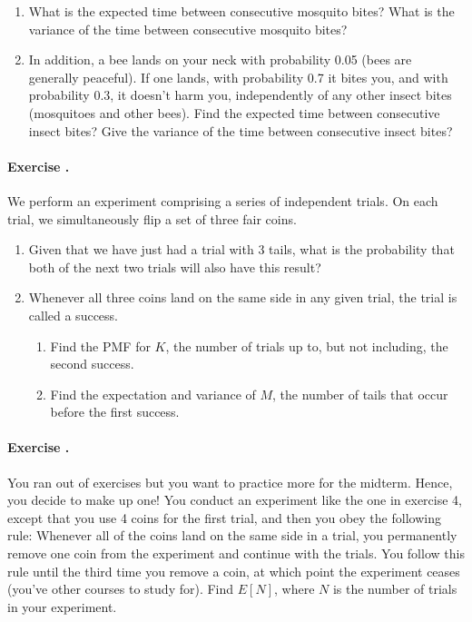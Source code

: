 \documentclass[twocolumn,12pt,a4paper]{article}
\newcounter{num}  %
\begin{document}
\begin{enumerate}
	\item What is the expected time between consecutive mosquito bites? What is the variance of the time between consecutive mosquito bites?
	
	\item In addition, a bee lands on your neck with probability 0.05 (bees are generally peaceful). If one lands, with probability 0.7 it bites you, and with probability 0.3, it doesn't harm you, independently of any other insect bites (mosquitoes and other bees). 
	Find the expected time between consecutive insect bites? 
	Give the variance of the time between consecutive insect bites?
\end{enumerate}


\paragraph{Exercise \thenum.}\label{ex:4}
We perform an experiment comprising a series of independent trials. On each trial, we simultaneously flip a set of three fair coins.

\begin{enumerate}
	\item Given that we have just had a trial with 3 tails, what is the probability that both of the next two trials will also have this result?
	
	\item Whenever all three coins land on the same side in any given trial, the trial is called a success.
	\begin{enumerate}
		\item Find the PMF for \( K \), the number of trials up to, but not including, the second success.
		
		\item Find the expectation and variance of \( M \), the number of tails that occur before the first success.
	\end{enumerate}
\end{enumerate}


\paragraph{Exercise \thenum.}
You ran out of exercises but you want to practice more for the midterm. Hence, you decide to make up one!
You conduct an experiment like the one in exercise 4, except that you use 4 coins for the first trial, and then you obey the following rule: Whenever all of the coins land on the same side in a trial, you permanently remove one coin from the experiment and continue with the trials. 
You follow this rule until the third time you remove a coin, at which point the experiment ceases (you've other courses to study for). 
Find \( E[N] \), where \( N \) is the number of trials in your experiment.
\end{document}
